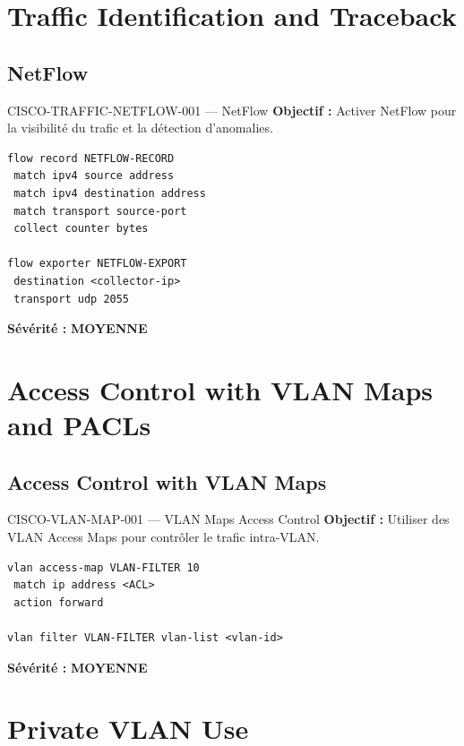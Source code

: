 \documentclass[12pt, a4paper]{report}
\begin{document}
\section{Traffic Identification and Traceback}

\subsection{NetFlow}

\begin{rulebox}{CISCO-TRAFFIC-NETFLOW-001 — NetFlow}
  \textbf{Objectif :} Activer NetFlow pour la visibilité du trafic et la détection d'anomalies.

  \begin{lstlisting}
flow record NETFLOW-RECORD
 match ipv4 source address
 match ipv4 destination address
 match transport source-port
 collect counter bytes

flow exporter NETFLOW-EXPORT
 destination <collector-ip>
 transport udp 2055
  \end{lstlisting}

  \textbf{Sévérité :} \textcolor{accentGreen}{\textbf{MOYENNE}}
\end{rulebox}

\section{Access Control with VLAN Maps and PACLs}

\subsection{Access Control with VLAN Maps}

\begin{rulebox}{CISCO-VLAN-MAP-001 — VLAN Maps Access Control}
  \textbf{Objectif :} Utiliser des VLAN Access Maps pour contrôler le trafic intra-VLAN.

  \begin{lstlisting}
vlan access-map VLAN-FILTER 10
 match ip address <ACL>
 action forward

vlan filter VLAN-FILTER vlan-list <vlan-id>
  \end{lstlisting}

  \textbf{Sévérité :} \textcolor{accentGreen}{\textbf{MOYENNE}}
\end{rulebox}

\section{Private VLAN Use}
\end{document}

